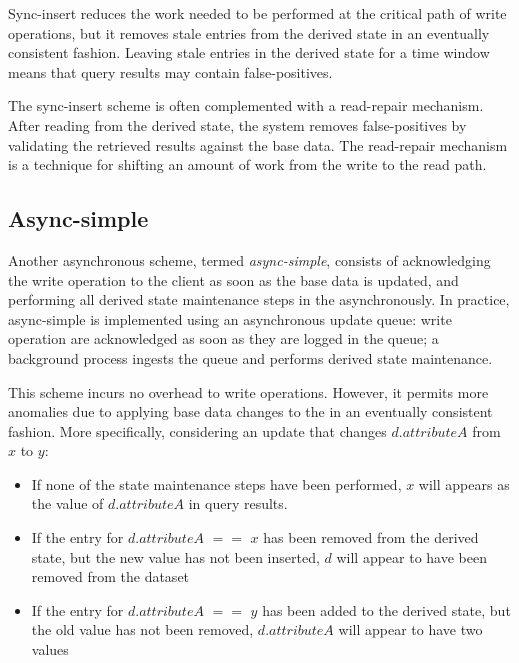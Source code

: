 Sync-insert reduces the work needed to be performed at the critical path of write operations,
but it removes stale entries from the derived state in an eventually consistent fashion.
Leaving stale entries in the derived state for a time window means that query results may contain false-positives.

The sync-insert scheme is often complemented with a read-repair mechanism.
After reading from the derived state, the system removes false-positives by validating the retrieved results against
the base data.
The read-repair mechanism is a technique for shifting an amount of work from the write to the read path.

\subsection{Async-simple}
Another asynchronous scheme, termed \textit{async-simple}, consists of acknowledging the write operation to
the client as soon as the base data is updated,
and performing all derived state maintenance steps in the asynchronously.
In practice, async-simple is implemented using an asynchronous update queue:
write operation are acknowledged as soon as they are logged in the queue;
a background process ingests the queue and performs derived state maintenance.

This scheme incurs no overhead to write operations.
However, it permits more anomalies due to applying base data changes to the in an eventually consistent fashion.
More specifically, considering an update that changes $d.attributeA$ from $x$ to $y$:
\begin{itemize}
  \item If none of the state maintenance steps have been performed, $x$ will appears as the value of $d.attributeA$
  in query results.

  \item If the entry for $d.attributeA$ $==$ $x$ has been removed from the derived state, but the new value has not been
  inserted, $d$ will appear to have been removed from the dataset

  \item If the entry for $d.attributeA$ $==$ $y$ has been added to the derived state, but the old value has not been
  removed, $d.attributeA$ will appear to have two values
\end{itemize}


